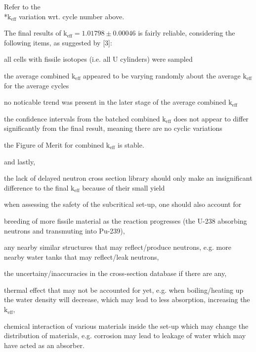 \documentclass[a4paper, 12pt]{article}
\begin{document}
\begin{compactenum}
	Refer to the \\*$\text{k}_{\text{eff}}$ variation wrt. cycle number above.
	\item The final results of $\text{k}_{\text{eff}} = 1.01798 \pm 0.00046$ is fairly reliable, considering the following items, as suggested by [3]:
	\begin{compactitem}
		\item all cells with fissile isotopes (i.e. all U cylinders) were sampled
		\item the average combined $\text{k}_{\text{eff}}$ appeared to be varying randomly about the average $\text{k}_{\text{eff}}$ for the average cycles
		\item no noticable trend was present in the later stage of the average combined $\text{k}_{\text{eff}}$
		\item the confidence intervals from the batched combined $\text{k}_{\text{eff}}$ does not appear to differ significantly from the final result, meaning there are no cyclic variations
		\item the Figure of Merit for combined $\text{k}_{\text{eff}}$ is stable.
	\end{compactitem}
	and lastly,
	\begin{compactitem}
		\item the lack of delayed neutron cross section library should only make an insignificant difference to the final $\text{k}_{\text{eff}}$ because of their small yield
	\end{compactitem}
	\item when assessing the safety of the subcritical set-up, one should also account for
	\begin{compactitem}
		\item breeding of more fissile material as the reaction progresses (the U-238 absorbing neutrons and transmuting into Pu-239),
		\item any nearby similar structures that may reflect/produce neutrons, e.g. more nearby water tanks that may reflect/leak neutrons,
		\item the uncertainy/inaccuracies in the cross-section database if there are any,
		\item thermal effect that may not be accounted for yet, e.g. when boiling/heating up the water density will decrease, which may lead to less absorption, increasing the $\text{k}_{\text{eff}}$,
		\item chemical interaction of various materials inside the set-up which may change the distribution of materials, e.g. corrosion may lead to leakage of water which may have acted as an absorber.
	\end{compactitem}
\end{compactenum}
\end{document}
